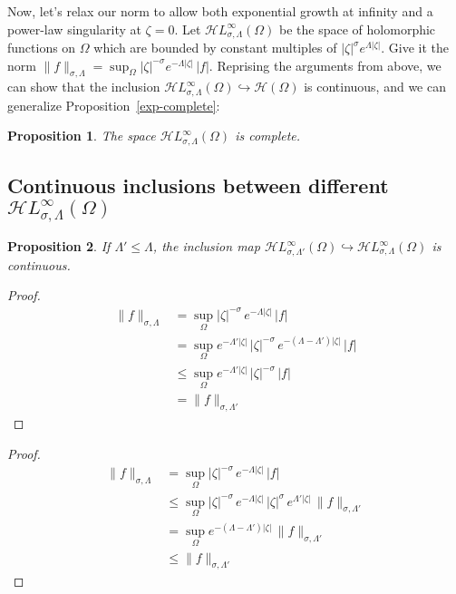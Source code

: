 \documentclass{article}
\theoremstyle{plain}
\newtheorem{prop}{Proposition}
\newcommand{\holo}{\mathcal{H}}
\newcommand{\singexp}[2]{\mathcal{H}L^\infty_{#1, #2}}
\begin{document}
Now, let's relax our norm to allow both exponential growth at infinity and a power-law singularity at $\zeta = 0$. Let $\singexp{\sigma}{\Lambda}(\Omega)$ be the space of holomorphic functions on $\Omega$ which are bounded by constant multiples of $|\zeta|^\sigma e^{\Lambda|\zeta|}$. Give it the norm $\|f\|_{\sigma,\Lambda} = \sup_\Omega |\zeta|^{-\sigma} e^{-\Lambda|\zeta|}\,|f|$. Reprising the arguments from above, we can show that the inclusion $\singexp{\sigma}{\Lambda}(\Omega) \hookrightarrow \holo(\Omega)$ is continuous, and we can generalize Proposition~\ref{exp-complete}:
\begin{prop}
The space $\singexp{\sigma}{\Lambda}(\Omega)$ is complete.
\end{prop}

\subsection{Continuous inclusions between different $\singexp{\sigma}{\Lambda}(\Omega)$}
\begin{prop}
    If $\Lambda'\leq\Lambda$, the inclusion map $\singexp{\sigma}{\Lambda'}(\Omega)\hookrightarrow \singexp{\sigma}{\Lambda}(\Omega)$ is continuous.
\end{prop}

\begin{proof}
    \begin{align*}
        \|f\|_{\sigma,\Lambda}&=\sup_{\Omega} |\zeta|^{-\sigma}\,  e^{-\Lambda |\zeta|}\, |f|\\
        &= \sup_{\Omega} e^{-\Lambda'|\zeta|}\,|\zeta|^{-\sigma}\,e^{-(\Lambda-\Lambda') |\zeta|}\,|f|\\
        &\leq \sup_\Omega e^{-\Lambda'|\zeta|}\,|\zeta|^{-\sigma}\,|f|\\
        &=\|f\|_{\sigma,\Lambda'}
    \end{align*}
\end{proof}
\color{OrangeRed}
\begin{proof}
    \begin{align*}
        \|f\|_{\sigma,\Lambda}&=\sup_{\Omega} |\zeta|^{-\sigma}\,e^{-\Lambda |\zeta|}\, |f|\\
        &\leq \sup_{\Omega} |\zeta|^{-\sigma}\,e^{-\Lambda |\zeta|}\,|\zeta|^\sigma\,e^{\Lambda'|\zeta|}\,\|f\|_{\sigma, \Lambda'}\\
        &=\sup_{\Omega} e^{-(\Lambda-\Lambda') |\zeta|}\,\|f\|_{\sigma, \Lambda'}\\
        &\leq \|f\|_{\sigma,\Lambda'}
    \end{align*}
\end{proof}
\color{black}
\end{document}
